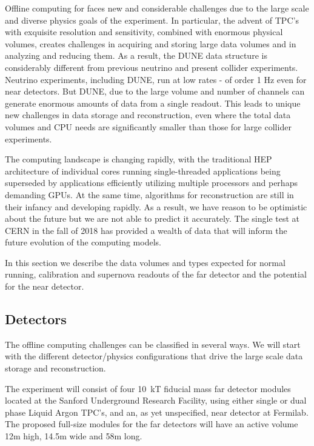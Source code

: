 
Offline computing for   faces new and considerable challenges due to the large scale and diverse physics goals of the experiment.  In particular, the advent of  TPC's with exquisite resolution and sensitivity, combined with enormous physical volumes, creates challenges in acquiring and storing large data volumes and in analyzing and reducing them.  
As a result, the DUNE data structure is considerably different from previous neutrino and present collider experiments. Neutrino experiments, including DUNE, run at low rates - of order 1 Hz even for near detectors. But DUNE, due to the large volume and number of channels can generate enormous amounts of data from a single readout.
This leads to unique new challenges in data storage and reconstruction, even where the total data volumes and CPU needs are significantly smaller than those for large collider experiments.  

The computing landscape is changing rapidly, with the traditional HEP architecture of individual cores running single-threaded applications being superseded by applications efficiently utilizing multiple processors and perhaps demanding GPUs. At the same time, algorithms for  reconstruction are still in their infancy and developing rapidly.  As a result, we have reason to be optimistic about the future but we are not able to predict it accurately.  The  single test at CERN in the fall of 2018 has provided a wealth of data that will inform the future evolution of  the  computing models.

In this section we describe the data volumes and types expected for normal running, calibration and supernova readouts of the far detector and the potential for the near detector. 



\subsection{Detectors}

The   offline computing challenges can be classified in several ways.  We will start with the different detector/physics configurations that drive the large scale data storage and reconstruction. 

The  experiment will consist of four 10~kT fiducial mass far detector modules located at  the Sanford Underground Research Facility, using either single or dual phase Liquid Argon TPC's, and an, as yet unspecified, near detector at Fermilab.
The proposed  full-size  modules for the far detectors will  have an active volume 12m high, 14.5m wide and 58m long. 


